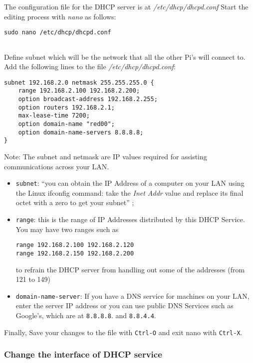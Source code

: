 The configuration file for the DHCP server is at
\emph{/etc/dhcp/dhcpd.conf} Start the editing process with \emph{nano}
as follows:

\begin{lstlisting}
sudo nano /etc/dhcp/dhcpd.conf
    
\end{lstlisting}

Define subnet which will be the network that all the other Pi's will
connect to. Add the following lines to the file
\emph{/etc/dhcp/dhcpd.conf}:

\begin{lstlisting}
subnet 192.168.2.0 netmask 255.255.255.0 {
    range 192.168.2.100 192.168.2.200;
    option broadcast-address 192.168.2.255;
    option routers 192.168.2.1;
    max-lease-time 7200;
    option domain-name "red00";
    option domain-name-servers 8.8.8.8;
}
\end{lstlisting}

Note: The subnet and netmask are IP values required for assisting
communications across your LAN.

\begin{itemize}
\item
  \texttt{subnet}: ``you can obtain the IP Address of a computer on your
  LAN using the Linux ifconfig command: take the \emph{Inet Addr} value
  and replace its final octet with a zero to get your subnet''
  \cite{hid-sp18-405-tutorial-pidhcp-pdf};
\item
  \texttt{range}: this is the range of IP Addresses distributed by this
  DHCP Service. You may have two ranges such as

\begin{lstlisting}
range 192.168.2.100 192.168.2.120
range 192.168.2.150 192.168.2.200
\end{lstlisting}

  to refrain the DHCP server from handling out some of the addresses
  (from 121 to 149)
\item
  \texttt{domain-name-server}: If you have a DNS service for machines on
  your LAN, enter the server IP address or you can use public DNS
  Services such as Google's, which are at \texttt{8.8.8.8}. and
  \texttt{8.8.4.4}.
\end{itemize}

Finally, Save your changes to the file with \texttt{Ctrl-O} and exit
nano with \texttt{Ctrl-X}.

\subsubsection{Change the interface of DHCP service}

